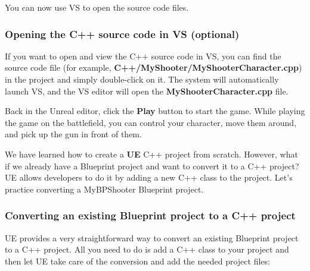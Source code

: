 \documentclass[11pt]{article} %
\begin{document}
You can now use VS to open the source code files.

\subsubsection*{Opening the C++ source code in VS (optional)}

If you want to open and view the C++ source code in VS, you can find the source code file (for example, \textbf{C++/MyShooter/MyShooterCharacter.cpp}) in the project and simply double-click on it. The system will automatically launch VS, and the VS editor will open the \textbf{MyShooterCharacter.cpp} file.

Back in the Unreal editor, click the \textbf{Play} button to start the game. While playing the game on the battlefield, you can control your character, move them around, and pick up the gun in front of them.

We have learned how to create a \textbf{UE} C++ project from scratch. However, what if we already have a Blueprint project and want to convert it to a C++ project? UE allows developers to do it by adding a new C++ class to the project. Let’s practice converting a MyBPShooter Blueprint project.

\subsubsection*{Converting an existing Blueprint project to a C++ project}

UE provides a very straightforward way to convert an existing Blueprint project to a C++ project. All you need to do is add a C++ class to your project and then let UE take care of the conversion and add the needed project files:
\end{document}
